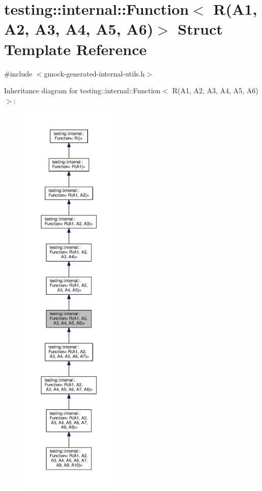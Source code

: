 \hypertarget{structtesting_1_1internal_1_1_function_3_01_r_07_a1_00_01_a2_00_01_a3_00_01_a4_00_01_a5_00_01_a6_08_4}{}\section{testing\+:\+:internal\+:\+:Function$<$ R(A1, A2, A3, A4, A5, A6)$>$ Struct Template Reference}
\label{structtesting_1_1internal_1_1_function_3_01_r_07_a1_00_01_a2_00_01_a3_00_01_a4_00_01_a5_00_01_a6_08_4}


{\ttfamily \#include $<$gmock-\/generated-\/internal-\/utils.\+h$>$}



Inheritance diagram for testing\+:\+:internal\+:\+:Function$<$ R(A1, A2, A3, A4, A5, A6)$>$\+:
\nopagebreak
\begin{figure}[H]
\begin{center}
\leavevmode
\includegraphics[height=550pt]{structtesting_1_1internal_1_1_function_3_01_r_07_a1_00_01_a2_00_01_a3_00_01_a4_00_01_a5_00_01_a6_08_4__inherit__graph}
\end{center}
\end{figure}


